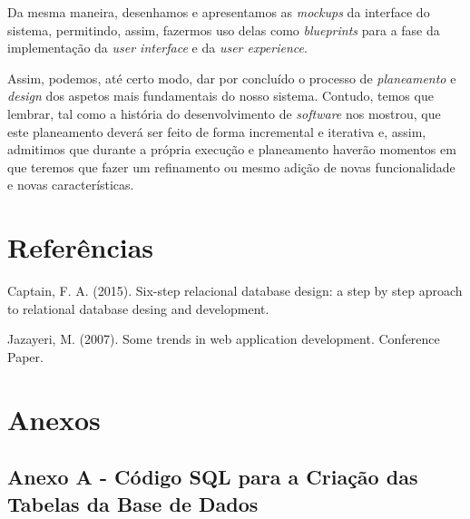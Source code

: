 \documentclass[a4paper,12pt]{report}
\begin{document}
	Da mesma maneira, desenhamos e apresentamos as \textit{mockups} da interface do sistema, permitindo, assim, fazermos uso delas como \textit{blueprints} para a fase da implementação da \textit{user interface} e da \textit{user experience}.
	
	Assim, podemos, até certo modo, dar por concluído o processo de \textit{planeamento} e \textit{design} dos aspetos mais fundamentais do nosso sistema. Contudo, temos que lembrar, tal como a história do desenvolvimento de \textit{software} nos mostrou, que este planeamento deverá ser feito de forma incremental e iterativa e, assim, admitimos que durante a própria execução e planeamento haverão momentos em que teremos que fazer um refinamento ou mesmo adição de novas funcionalidade e novas características. 
	
	

\titleformat{\chapter}[display]
{\normalfont\bfseries}{}{0pt}{\Huge}
\chapter{Referências}

Captain, F. A. (2015). Six-step relacional database design: a step by step aproach to relational database desing and development. 

Jazayeri, M. (2007). Some trends in web application development. Conference Paper. 


\newpage
\titleformat{\chapter}[display]
{\normalfont\bfseries}{}{0pt}{\Huge}
\chapter{Anexos}

\section{Anexo A - Código SQL para a Criação das Tabelas da Base de Dados} \label{anexoA}
\end{document}
